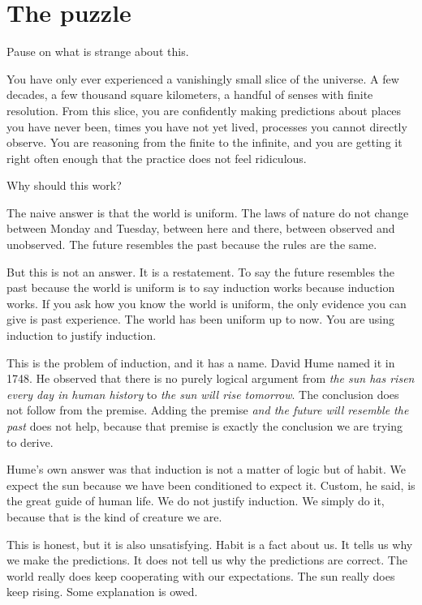 \section*{The puzzle}

Pause on what is strange about this.

You have only ever experienced a vanishingly small slice of the universe. A few decades, a few thousand square kilometers, a handful of senses with finite resolution. From this slice, you are confidently making predictions about places you have never been, times you have not yet lived, processes you cannot directly observe. You are reasoning from the finite to the infinite, and you are getting it right often enough that the practice does not feel ridiculous.

Why should this work?

The naive answer is that the world is uniform. The laws of nature do not change between Monday and Tuesday, between here and there, between observed and unobserved. The future resembles the past because the rules are the same.

But this is not an answer. It is a restatement. To say the future resembles the past because the world is uniform is to say induction works because induction works. If you ask how you know the world is uniform, the only evidence you can give is past experience. The world has been uniform up to now. You are using induction to justify induction.

This is the problem of induction, and it has a name. David Hume named it in 1748. He observed that there is no purely logical argument from \emph{the sun has risen every day in human history} to \emph{the sun will rise tomorrow}. The conclusion does not follow from the premise. Adding the premise \emph{and the future will resemble the past} does not help, because that premise is exactly the conclusion we are trying to derive.

Hume's own answer was that induction is not a matter of logic but of habit. We expect the sun because we have been conditioned to expect it. Custom, he said, is the great guide of human life. We do not justify induction. We simply do it, because that is the kind of creature we are.

This is honest, but it is also unsatisfying. Habit is a fact about us. It tells us why we make the predictions. It does not tell us why the predictions are correct. The world really does keep cooperating with our expectations. The sun really does keep rising. Some explanation is owed.

